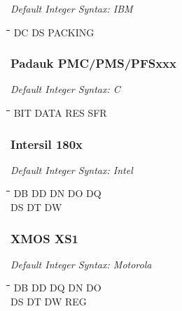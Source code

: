 {\em Default Integer Syntax: IBM}

{\tt\begin{tabbing}
\hspace{3cm}\=\hspace{3cm}\=\hspace{3cm}\=\hspace{3cm}\=\kill
DC         \> DS          \> PACKING \\
\end{tabbing}}

\subsubsection{Padauk PMC/PMS/PFSxxx}

{\em Default Integer Syntax: C}

{\tt\begin{tabbing}
\hspace{3cm}\=\hspace{3cm}\=\hspace{3cm}\=\hspace{3cm}\=\kill
BIT        \> DATA       \> RES       \> SFR \\
\end{tabbing}}

\subsubsection{Intersil 180x}

{\em Default Integer Syntax: Intel}

{\tt\begin{tabbing}
\hspace{3cm}\=\hspace{3cm}\=\hspace{3cm}\=\hspace{3cm}\=\kill
DB         \> DD          \> DN          \> DO          \> DQ \\
DS         \> DT          \> DW \\
\end{tabbing}}


\subsubsection{XMOS XS1}

{\em Default Integer Syntax: Motorola}

{\tt\begin{tabbing}
\hspace{3cm}\=\hspace{3cm}\=\hspace{3cm}\=\hspace{3cm}\=\kill
DB         \> DD          \> DQ          \> DN          \> DO \\
DS         \> DT          \> DW          \> REG \\
\end{tabbing}}

